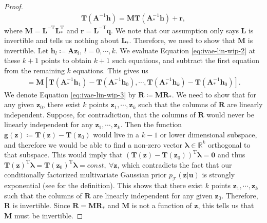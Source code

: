 \documentclass[nohyperref]{article}
\theoremstyle{plain}
\theoremstyle{definition}
\theoremstyle{remark}
\begin{document}
\begin{proof}
    \begin{align}
        \mathbf{T}(\mathbf{A}^{-1}\mathbf{h})=\mathbf{M}\mathbf{T}(\mathbf{A}_{*}^{-1}\mathbf{h}) +\mathbf{r},\label{eq:ivae-lin-wip-2}
    \end{align}
    where $\mathbf{M}=\mathbf{L}^{-\text{T}}\mathbf{L}_{*}^{\text{T}}$ and $\mathbf{r}=\mathbf{L}^{-\text{T}}\mathbf{q}$. We note that our assumption only says $\mathbf{L}$ is invertible and tells us nothing about $\mathbf{L}_{*}$. Therefore, we need to show that $\mathbf{M}$ is invertible.
    Let $\mathbf{h}_l\coloneqq\mathbf{A}\mathbf{z}_l,~l=0,\cdots,k$. We evaluate Equation \eqref{eq:ivae-lin-wip-2} at these $k+1$ points to obtain $k+1$ such equations, and subtract the first equation from the remaining $k$ equations. This gives us
    \begin{align}
        [\mathbf{T}(\mathbf{z}_1)-\mathbf{T}(\mathbf{z}_0),\cdots,\mathbf{T}(\mathbf{z}_k)-\mathbf{T}(\mathbf{z}_0)]=\mathbf{M}[\mathbf{T}(\mathbf{A}_{*}^{-1}\mathbf{h}_1)-\mathbf{T}(\mathbf{A}_{*}^{-1}\mathbf{h}_0),\cdots,\mathbf{T}(\mathbf{A}_{*}^{-1}\mathbf{h}_k)-\mathbf{T}(\mathbf{A}_{*}^{-1}\mathbf{h}_0)].\label{eq:ivae-lin-wip-3}
    \end{align}
    We denote Equation \eqref{eq:ivae-lin-wip-3} by $\mathbf{R}\coloneqq\mathbf{M}\mathbf{R}_{*}$. We need to show that for any given $\mathbf{z}_0$, there exist $k$ points $\mathbf{z}_1,\cdots,\mathbf{z}_k$ such that the columns of $\mathbf{R}$ are linearly independent. Suppose, for contradiction, that the columns of $\mathbf{R}$ would never be linearly independent for any $\mathbf{z}_1,\cdots,\mathbf{z}_k$. Then the function $\mathbf{g}(\mathbf{z})\coloneqq\mathbf{T}(\mathbf{z})-\mathbf{T}(\mathbf{z}_0)$ would live in a $k-1$ or lower dimensional subspace, and therefore we would be able to find a non-zero vector $\boldsymbol{\lambda}\in\mathbb{R}^k$ orthogonal to that subspace. This would imply that $(\mathbf{T}(\mathbf{z})-\mathbf{T}(\mathbf{z}_0))^{\text{T}}\boldsymbol{\lambda}=\mathbf{0}$ and thus $\mathbf{T}(\mathbf{z})^{\text{T}}\boldsymbol{\lambda}=\mathbf{T}(\mathbf{z}_0)^{\text{T}}\boldsymbol{\lambda}=const,~\forall\mathbf{z}$, which contradicts the fact that our conditionally factorized multivariate Gaussian prior $p_{\mathcal{T}}(\mathbf{z}|\mathbf{u})$ is strongly exponential (see \citet{Khemakhem_Kingma_Monti_Hyvarinen_2020} for the definition). This shows that there exist $k$ points $\mathbf{z}_1,\cdots,\mathbf{z}_k$ such that the columns of $\mathbf{R}$ are linearly independent for any given $\mathbf{z}_0$. Therefore, $\mathbf{R}$ is invertible. Since $\mathbf{R}=\mathbf{M}\mathbf{R}_{*}$ and $\mathbf{M}$ is not a function of $\mathbf{z}$, this tells us that $\mathbf{M}$ must be invertible.
    

\end{proof}
\end{document}
